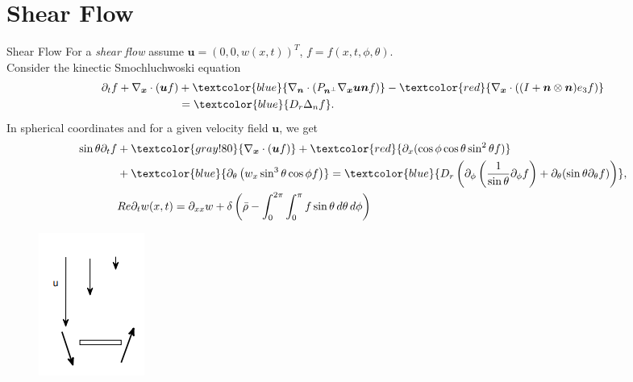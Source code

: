 \section{Shear Flow}
\begin{frame}{Shear Flow}
	\scriptsize
	For a \textit{shear flow} assume $	\boldsymbol{u} = (0,0,w(x,t))^T$, $f=f(x,t,\phi,\theta)$. \\
		\vspace{12pt}
		\scriptsize
		Consider the kinectic Smochluchwoski equation
		\begin{align*}
			\partial_t f+ \nabla_{\boldsymbol{x}} \cdot(\boldsymbol{u} f) & +\textcolor{blue}{\nabla_{\boldsymbol{n}} \cdot\left(P_{\boldsymbol{n}^{\perp}} \nabla_{\boldsymbol{x}} \boldsymbol{u} \boldsymbol{n} f\right)}-\textcolor{red}{\nabla_{\boldsymbol{x}} \cdot\left((I+\boldsymbol{n} \otimes \boldsymbol{n}) e_3 f\right)} \notag \\
			& = \textcolor{blue}{D_r \Delta_n f} .\label{SmochEq_kurz}
		\end{align*}
		\vspace{12pt}
		In spherical coordinates and for a given velocity field $\boldsymbol{u}$, we get
\begin{equation}
	\begin{aligned}
		\sin\theta \partial_{t}f & + \textcolor{gray!80}{\nabla_{\boldsymbol{x}} \cdot(\boldsymbol{u} f)} + \textcolor{red}{\partial_x (\cos\phi \cos\theta \sin^2\theta f)} \\
		& + \textcolor{blue}{\partial_\theta \left(w_x \sin^3 \theta \cos \phi f\right)}
		= \textcolor{blue}{D_{r} \left( \partial_\phi \left(\frac{1}{\sin \theta} \partial_\phi f \right) + \partial_\theta (\sin \theta \partial_\theta f) \right)}, \\
		& Re \partial_{t}w(x,t) = \partial_{xx}w + \delta \left( \bar{\rho} - \int_{0}^{2\pi} \int_{0}^{\pi} f \sin \theta \, d\theta \, d\phi \right) \label{SmochEq_wx}
	\end{aligned}
\end{equation}
\begin{figure}[H]
    \flushleft
	\includegraphics[scale=0.5]{Bilder/Ausrichtung_Partikeln}
\end{figure}
\end{frame}









